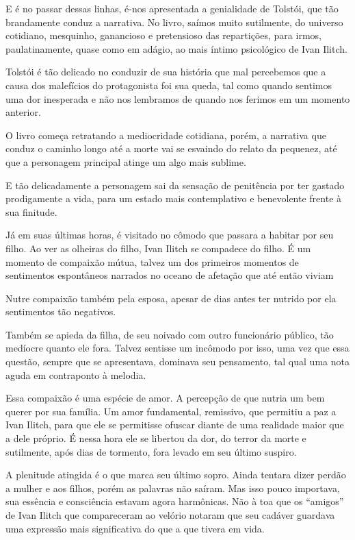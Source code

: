 \documentclass[12pt]{extarticle}
\begin{document}
E é no passar dessas linhas, é-nos apresentada a genialidade de Tolstói,
que tão brandamente conduz a narrativa. No livro, saímos muito
sutilmente, do universo cotidiano, mesquinho, ganancioso e pretensioso
das repartições, para irmos, paulatinamente, quase como em adágio, ao
mais íntimo psicológico de Ivan Ilitch.

Tolstói é tão delicado no conduzir de sua história que mal percebemos
que a causa dos malefícios do protagonista foi sua queda, tal como
quando sentimos uma dor inesperada e não nos lembramos de quando nos
ferimos em um momento anterior.

O livro começa retratando a mediocridade cotidiana, porém, a narrativa
que conduz o caminho longo até a morte vai se esvaindo do relato da
pequenez, até que a personagem principal atinge um algo mais sublime.

E tão delicadamente a personagem sai da sensação de penitência por ter
gastado prodigamente a vida, para um estado mais contemplativo e
benevolente frente à sua finitude.

Já em suas últimas horas, é visitado no cômodo que passara a habitar por
seu filho. Ao ver as olheiras do filho, Ivan Ilitch se compadece do
filho. É um momento de compaixão mútua, talvez um dos primeiros momentos
de sentimentos espontâneos narrados no oceano de afetação que até então
viviam

Nutre compaixão também pela esposa, apesar de dias antes ter nutrido por
ela sentimentos tão negativos.

Também se apieda da filha, de seu noivado com outro funcionário público,
tão medíocre quanto ele fora. Talvez sentisse um incômodo por isso, uma
vez que essa questão, sempre que se apresentava, dominava seu
pensamento, tal qual uma nota aguda em contraponto à melodia.

Essa compaixão é uma espécie de amor. A percepção de que nutria um bem
querer por sua família. Um amor fundamental, remissivo, que permitiu a
paz a Ivan Ilitch, para que ele se permitisse ofuscar diante de uma
realidade maior que a dele próprio. É nessa hora ele se libertou da dor,
do terror da morte e sutilmente, após dias de tormento, fora levado em
seu último suspiro.

A plenitude atingida é o que marca seu último sopro. Ainda tentara dizer
perdão a mulher e aos filhos, porém as palavras não saíram. Mas isso
pouco importava, sua essência e consciência estavam agora harmônicas.
Não à toa que os ``amigos'' de Ivan Ilitch que compareceram ao velório
notaram que seu cadáver guardava uma expressão mais significativa do que
a que tivera em vida.
\end{document}
